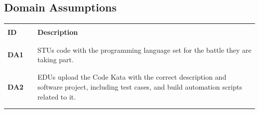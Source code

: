 \subsection{Domain Assumptions}
\begin{table}[H]
    \centering
    \renewcommand{\arraystretch}{0.5}
    \begin{tabular}{l l p{10.5cm}}
        \hline
                     &        &                                                                                                                                                                                                                                                     \\
        \textbf{ID}  & \vline & \textbf{Description}                                                                                                                                                                                                                                \\
                     &        &                                                                                                                                                                                                                                                     \\\hline & & \\
        \textbf{DA1} & \vline & STUs code with the programming language set for the battle they are taking part.                                                                                                                                                                    \\
                     &        &                                                                                                                                                                                                                                                     \\\hline & & \\
        \textbf{DA2} & \vline & EDUs upload the Code Kata with the correct description and software project, including test cases, and build automation scripts related to it.                                                                                                      \\
                     &        &                                                                                                                                                                                                                                                     \\\hline & & \\

\end{tabular}
\end{table}
